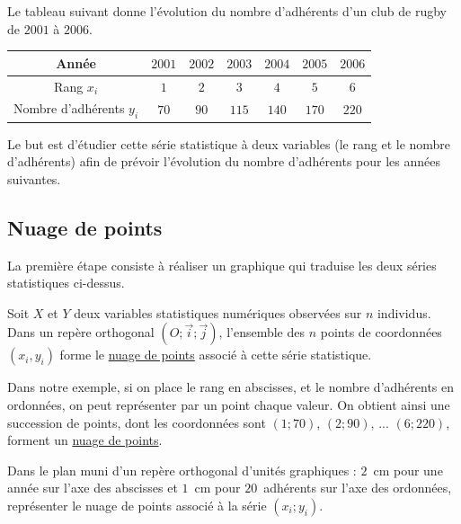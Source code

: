 \documentclass[french]{book}
\newcommand{\ve}[1]{\overrightarrow{#1}}
\newcommand{\Rep}{(O;\ve{i};\ve{j})}
\begin{document}
\begin{exemple}
Le tableau suivant donne l'évolution du nombre d'adhérents d'un club de rugby de $2001$ à $2006$.
\begin{center}
   \begin{tabular}{|c|*{6}{C{1}|}}
      \hline
      Année & $2001$ & $2002$ & $2003$ & $2004$ & $2005$ & $2006$ \\
      \hline
      Rang $x_{i}$ & $1$ & $2$ & $3$ & $4$ & $5$ & $6$ \\
      \hline
      Nombre d'adhérents $y_{i}$ & $70$ & $90$ & $115$ & $140$ & $170$ & $220$ \\
      \hline
   \end{tabular}
\end{center}
Le but est d'étudier cette série statistique à deux variables (le rang et le nombre d'adhérents) afin de prévoir l'évolution du nombre d'adhérents pour les années suivantes.
\end{exemple}

\subsection{Nuage de points}

La première étape consiste à réaliser un graphique qui traduise les deux séries statistiques ci-dessus.

\begin{defn}
   Soit $X$ et $Y$ deux variables statistiques numériques observées sur $n$ individus.\\
   Dans un repère orthogonal $\Rep$, l'ensemble des $n$ points de coordonnées $(x_i,y_i)$ forme le \underline{nuage de points} associé à cette série statistique.
\end{defn}

Dans notre exemple, si on place le rang en abscisses, et le nombre d'adhérents en ordonnées, on peut représenter par un point chaque valeur. On obtient ainsi une succession de points, dont les coordonnées sont $(1;70)$, $(2;90)$, ... $(6;220)$, forment un \underline{nuage de points}.



\begin{exemple}
   Dans le plan muni d'un repère orthogonal d'unités graphiques : $2$~cm pour une année sur l'axe des abscisses et $1$~cm pour $20$~adhérents sur l'axe des ordonnées, représenter le nuage de points associé à la série $(x_{i};y_{i})$.
\end{exemple}
\end{document}
